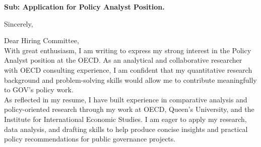 \documentclass[11pt,a4paper,roman]{moderncv}
\begin{document}
\date{\today}
\opening{\textbf{Sub: Application for Policy Analyst Position.}}
\closing{Sincerely, \vspace{-1em}}


\makelettertitle



Dear Hiring Committee,
\\
\vspace{1em}
With great enthusiasm, I am writing to express my strong interest in the Policy Analyst position at the OECD. As an analytical and collaborative researcher with OECD consulting experience, I am confident that my quantitative research background and problem-solving skills would allow me to contribute meaningfully to GOV's policy work.\\

\vspace{1em}
As reflected in my resume, I have built experience in comparative analysis and policy-oriented research through my work at OECD, Queen's University, and the Institute for International Economic Studies. I am eager to apply my research, data analysis, and drafting skills to help produce concise insights and practical policy recommendations for public governance projects.\\
\vspace{1em}
\end{document}

